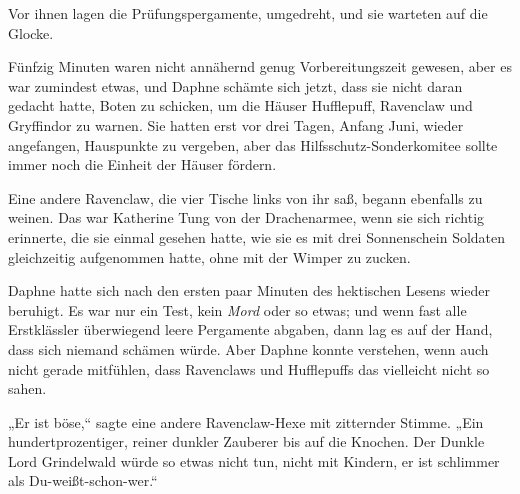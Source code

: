Vor ihnen lagen die Prüfungspergamente, umgedreht, und sie warteten auf die Glocke.

Fünfzig Minuten waren nicht annähernd genug Vorbereitungszeit gewesen, aber es war zumindest etwas, und Daphne schämte sich jetzt, dass sie nicht daran gedacht hatte, Boten zu schicken, um die Häuser Hufflepuff, Ravenclaw und Gryffindor zu warnen. Sie hatten erst vor drei Tagen, Anfang Juni, wieder angefangen, Hauspunkte zu vergeben, aber das Hilfsschutz-Sonderkomitee sollte immer noch die Einheit der Häuser fördern.

Eine andere Ravenclaw, die vier Tische links von ihr saß, begann ebenfalls zu weinen. Das war Katherine Tung von der Drachenarmee, wenn sie sich richtig erinnerte, die sie einmal gesehen hatte, wie sie es mit drei Sonnenschein Soldaten gleichzeitig aufgenommen hatte, ohne mit der Wimper zu zucken.

Daphne hatte sich nach den ersten paar Minuten des hektischen Lesens wieder beruhigt. Es war nur ein Test, kein \emph{Mord} oder so etwas; und wenn fast alle Erstklässler überwiegend leere Pergamente abgaben, dann lag es auf der Hand, dass sich niemand schämen würde. Aber Daphne konnte verstehen, wenn auch nicht gerade mitfühlen, dass Ravenclaws und Hufflepuffs das vielleicht nicht so sahen.

„Er ist böse,“ sagte eine andere Ravenclaw-Hexe mit zitternder Stimme. „Ein hundertprozentiger, reiner dunkler Zauberer bis auf die Knochen. Der Dunkle Lord Grindelwald würde so etwas nicht tun, nicht mit Kindern, er ist schlimmer als Du-weißt-schon-wer.“

